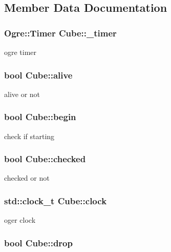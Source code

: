 \subsection{Member Data Documentation}
\hypertarget{class_cube_a18c8c6e055160dde284d46a60dedc92a}{
\subsubsection[{\-\_\-timer}]{\setlength{\rightskip}{0pt plus 5cm}Ogre\-::\-Timer Cube\-::\-\_\-timer}}\label{class_cube_a18c8c6e055160dde284d46a60dedc92a}
ogre timer \hypertarget{class_cube_a980ce3408a24527d888e4b3909824506}{
\subsubsection[{alive}]{\setlength{\rightskip}{0pt plus 5cm}bool Cube\-::alive}}\label{class_cube_a980ce3408a24527d888e4b3909824506}
alive or not \hypertarget{class_cube_a1eb14ea30f3a4a53cf4b889d99b0436c}{
\subsubsection[{begin}]{\setlength{\rightskip}{0pt plus 5cm}bool Cube\-::begin}}\label{class_cube_a1eb14ea30f3a4a53cf4b889d99b0436c}
check if starting \hypertarget{class_cube_a2bb4390eb460a9cf29de2ca916a4a9ec}{
\subsubsection[{checked}]{\setlength{\rightskip}{0pt plus 5cm}bool Cube\-::checked}}\label{class_cube_a2bb4390eb460a9cf29de2ca916a4a9ec}
checked or not \hypertarget{class_cube_ab100528af7d9cd8c40aa85b3eeb582d3}{
\subsubsection[{clock}]{\setlength{\rightskip}{0pt plus 5cm}std\-::clock\-\_\-t Cube\-::clock}}\label{class_cube_ab100528af7d9cd8c40aa85b3eeb582d3}
oger clock \hypertarget{class_cube_a07764788ed55a68115242e81efe3afaa}{
\subsubsection[{drop}]{\setlength{\rightskip}{0pt plus 5cm}bool Cube\-::drop}}\label{class_cube_a07764788ed55a68115242e81efe3afaa}
